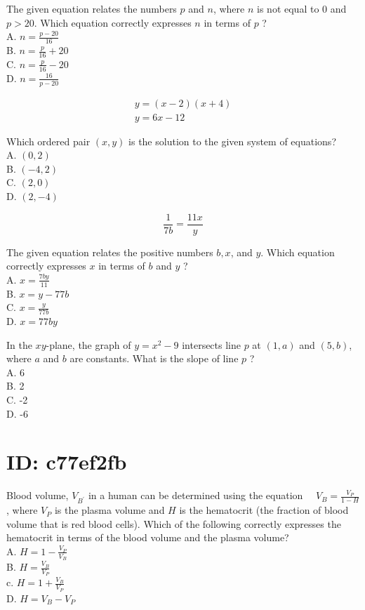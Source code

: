 The given equation relates the numbers $p$ and $n$, where $n$ is not equal to 0 and $p>20$. Which equation correctly expresses $n$ in terms of $p$ ?\\
A. $n=\frac{p-20}{16}$\\
B. $n=\frac{p}{16}+20$\\
C. $n=\frac{p}{16}-20$\\
D. $n=\frac{16}{p-20}$

$$
\begin{gathered}
y=(x-2)(x+4) \\
y=6 x-12
\end{gathered}
$$

Which ordered pair $(x, y)$ is the solution to the given system of equations?\\
A. $(0,2)$\\
B. $(-4,2)$\\
C. $(2,0)$\\
D. $(2,-4)$

$$
\frac{1}{7 b}=\frac{11 x}{y}
$$

The given equation relates the positive numbers $b, x$, and $y$. Which equation correctly expresses $x$ in terms of $b$ and $y$ ?\\
A. $x=\frac{7 b y}{11}$\\
B. $x=y-77 b$\\
C. $x=\frac{y}{77 b}$\\
D. $x=77 b y$

In the $x y$-plane, the graph of $y=x^{2}-9$ intersects line $p$ at $(1, a)$ and $(5, b)$, where $a$ and $b$ are constants. What is the slope of line $p$ ?\\
A. 6\\
B. 2\\
C. -2\\
D. -6

\section*{ID: c77ef2fb}
Blood volume, $V_{B^{\prime}}$ in a human can be determined using the equation $\quad V_{B}=\frac{V_{P}}{1-H}$ , where $V_{P}$ is the plasma volume and $H$ is the hematocrit (the fraction of blood volume that is red blood cells). Which of the following correctly expresses the hematocrit in terms of the blood volume and the plasma volume?\\
A. $H=1-\frac{V_{P}}{V_{B}}$\\
B. $H=\frac{V_{B}}{V_{P}}$\\
c. $H=1+\frac{V_{B}}{V_{P}}$\\
D. $H=V_{B}-V_{P}$

